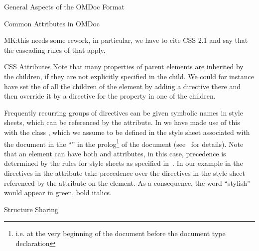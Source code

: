\begin{tchapter}[id=spec-intro]{General Aspects of the OMDoc Format}
\begin{tsection}[id=common-attribs]{Common Attributes in OMDoc}
\begin{oldpart}{MK:this needs some rework, in particular, we have to cite CSS 2.1 and say
    that the cascading rules of that apply.}
\begin{tsubsection}[id=css-attribs]{CSS Attributes}
Note that many {\css} properties of parent elements are inherited by the children,
if they are not explicitly specified in the child. We could for instance have set
the {} of all the children of the {} element
by adding a directive {} there and then override it by
a directive for the property {} in one of the children.

Frequently recurring groups of {\css} directives can be given symbolic names in {\css}
style sheets, which can be referenced by the
{} attribute. In {} we have made use of this
with the class {}, which we assume to be defined in the style sheet
{} associated with the document in the ``{}'' in the prolog\footnote{i.e. at the very beginning of
  the {\xml} document before the document type declaration} of the {\xml} document
(see~\cite{Clark:assxd99} for details).  Note that an {\omdoc} element can have both
{} and {} attributes, in this case, precedence
is determined by the rules for {\css} style sheets as specified in~\cite{BosHak:css98}. In
our example in {} the directives in the {}
attribute take precedence over the {\css} directives in the style sheet referenced by the
{} attribute on the {} element. As a
consequence, the word ``stylish'' would appear in green, bold italics.
\end{tsubsection}
\end{oldpart}
\end{tsection}

\begin{tsection}[id=sharing,short=Structure Sharing]{Structure Sharing}


\end{tsection}
\end{tchapter}
